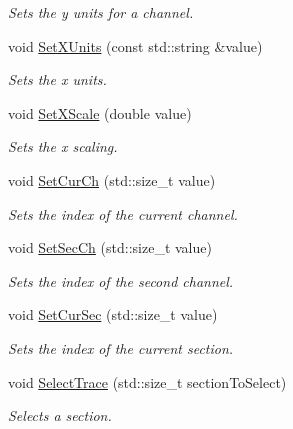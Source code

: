 \begin{DoxyCompactItemize}
\begin{DoxyCompactList}\small\item\em Sets the y units for a channel. \item\end{DoxyCompactList}\item 
void \hyperlink{classRecording_ac2864caaf7e6cff1e6d8bc00d81db113}{SetXUnits} (const std::string \&value)
\begin{DoxyCompactList}\small\item\em Sets the x units. \item\end{DoxyCompactList}\item 
void \hyperlink{classRecording_a5c59641f15063cb5993c4d297ef758c3}{SetXScale} (double value)
\begin{DoxyCompactList}\small\item\em Sets the x scaling. \item\end{DoxyCompactList}\item 
void \hyperlink{classRecording_a7bb841832cd3c19fa886b3751f587631}{SetCurCh} (std::size\_\-t value)
\begin{DoxyCompactList}\small\item\em Sets the index of the current channel. \item\end{DoxyCompactList}\item 
void \hyperlink{classRecording_a673afad1ebd1e14200f6a7a998ff75b4}{SetSecCh} (std::size\_\-t value)
\begin{DoxyCompactList}\small\item\em Sets the index of the second channel. \item\end{DoxyCompactList}\item 
void \hyperlink{classRecording_a01bfa0f5268595873ecc8fb5dd28dd1e}{SetCurSec} (std::size\_\-t value)
\begin{DoxyCompactList}\small\item\em Sets the index of the current section. \item\end{DoxyCompactList}\item 
void \hyperlink{classRecording_a25464285ee21886d7c187560330e64c2}{SelectTrace} (std::size\_\-t sectionToSelect)
\begin{DoxyCompactList}\small\item\em Selects a section. \item\end{DoxyCompactList}\item 

\end{DoxyCompactItemize}
